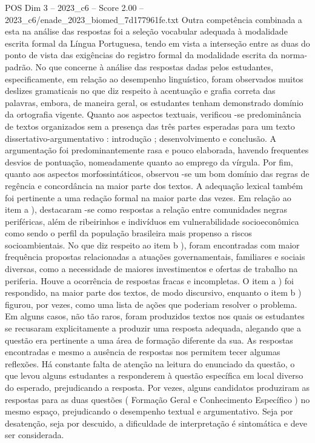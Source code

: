 \begin{textsample}{POS Dim 3 – 2023\_c6 – Score 2.00 – 2023\_c6/enade\_2023\_biomed\_7d177961fe.txt}
Outra competência combinada a esta na análise das respostas foi a seleção vocabular adequada à modalidade escrita formal da Língua Portuguesa, tendo em vista a interseção entre as duas do ponto de vista das exigências do registro formal da modalidade escrita da norma-padrão.
No que concerne à análise das respostas dadas pelos estudantes, especificamente, em relação ao desempenho linguístico, foram observados muitos deslizes gramaticais no que diz respeito à acentuação e grafia correta das palavras, embora, de maneira geral, os estudantes tenham demonstrado domínio da ortografia vigente.
Quanto aos aspectos textuais, verificou -se predominância de textos organizados sem a presença das três partes esperadas para um texto dissertativo-argumentativo : introdução ; desenvolvimento e conclusão.
A argumentação foi predominantemente rasa e pouco elaborada, havendo frequentes desvios de pontuação, nomeadamente quanto ao emprego da vírgula.
Por fim, quanto aos aspectos morfossintáticos, observou -se um bom domínio das regras de regência e concordância na maior parte dos textos.
A adequação lexical também foi pertinente a uma redação formal na maior parte das vezes.
Em relação ao item a ), destacaram -se como respostas a relação entre comunidades negras periféricas, além de ribeirinhos e indivíduos em vulnerabilidade socioeconômica como sendo o perfil da população brasileira mais propenso a riscos socioambientais.
No que diz respeito ao item b ), foram encontradas com maior frequência propostas relacionadas a atuações governamentais, familiares e sociais diversas, como a necessidade de maiores investimentos e ofertas de trabalho na periferia.
Houve a ocorrência de respostas fracas e incompletas.
O item a ) foi respondido, na maior parte dos textos, de modo discursivo, enquanto o item b ) figurou, por vezes, como uma lista de ações que poderiam resolver o problema.
Em alguns casos, não tão raros, foram produzidos textos nos quais os estudantes se recusaram explicitamente a produzir uma resposta adequada, alegando que a questão era pertinente a uma área de formação diferente da sua.
As respostas encontradas e mesmo a ausência de respostas nos permitem tecer algumas reflexões.
Há constante falta de atenção na leitura do enunciado da questão, o que levou alguns estudantes a responderem à questão específica em local diverso do esperado, prejudicando a resposta.
Por vezes, alguns candidatos produziram as respostas para as duas questões ( Formação Geral e Conhecimento Específico ) no mesmo espaço, prejudicando o desempenho textual e argumentativo.
Seja por desatenção, seja por descuido, a dificuldade de interpretação é sintomática e deve ser considerada.

\end{textsample}
